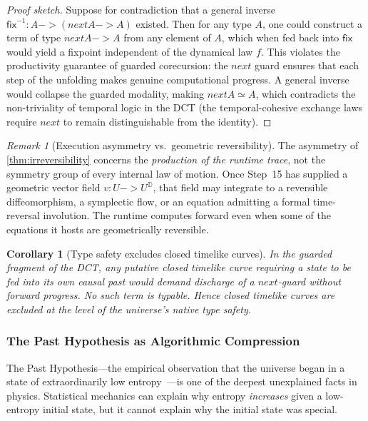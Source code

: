 \documentclass[11pt,a4paper]{article}
\def\to{->}%
\def\bigcirc{next}%
\theoremstyle{plain}
\newtheorem{corollary}[theorem]{Corollary}
\theoremstyle{definition}
\theoremstyle{remark}
\newtheorem{remark}[theorem]{Remark}
\newcommand{\D}{\mathbb{D}}
\begin{document}
\begin{proof}[Proof sketch]
Suppose for contradiction that a general inverse $\mathsf{fix}^{-1} : A \to (\bigcirc A \to A)$ existed.  Then for any type $A$, one could construct a term of type $\bigcirc A \to A$ from any element of $A$, which when fed back into $\mathsf{fix}$ would yield a fixpoint independent of the dynamical law $f$.  This violates the productivity guarantee of guarded corecursion: the $\bigcirc$ guard ensures that each step of the unfolding makes genuine computational progress.  A general inverse would collapse the guarded modality, making $\bigcirc A \simeq A$, which contradicts the non-triviality of temporal logic in the DCT (the temporal-cohesive exchange laws require $\bigcirc$ to remain distinguishable from the identity).
\end{proof}

\begin{remark}[Execution asymmetry vs.\ geometric reversibility]
The asymmetry of \cref{thm:irreversibility} concerns the \emph{production of the runtime trace}, not the symmetry group of every internal law of motion.  Once Step~15 has supplied a geometric vector field $v : U \to U^{\D}$, that field may integrate to a reversible diffeomorphism, a symplectic flow, or an equation admitting a formal time-reversal involution.  The runtime computes forward even when some of the equations it hosts are geometrically reversible.
\end{remark}

\begin{corollary}[Type safety excludes closed timelike curves]
\label{cor:no-ctc}
In the guarded fragment of the DCT, any putative closed timelike curve requiring a state to be fed into its own causal past would demand discharge of a $\bigcirc$-guard without forward progress.  No such term is typable.  Hence closed timelike curves are excluded at the level of the universe's native type safety.
\end{corollary}


\subsubsection{The Past Hypothesis as Algorithmic Compression}

The Past Hypothesis---the empirical observation that the universe began in a state of extraordinarily low entropy~\cite{penrose2004,carroll2001}---is one of the deepest unexplained facts in physics.  Statistical mechanics can explain why entropy \emph{increases} given a low-entropy initial state, but it cannot explain why the initial state was special.
\end{document}
